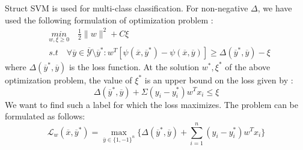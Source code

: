 \documentclass{article} %
\begin{document}
Struct SVM is used for multi-class classification. For non-negative $\Delta$, we have used the following formulation of optimization problem \cite{c1}:
\begin{equation*}
\begin{split}
& \underset{w,\xi \geq 0}{min} \quad \frac{1}{2}\|w\|^2+C\xi\\
& s.t \quad \forall\overline{y} \in \overline{\mathcal{Y}}\setminus\overline{y}^*:w^T[\psi(\overline{x},\overline{y}^*)- \psi(\overline{x},\overline{y})]\geq \Delta(\overline{y}^*,\overline{y})-\xi
\end{split}
\end{equation*}
where $\Delta(\overline{y}^*,\overline{y})$ is the loss function. At the solution $w^*, \xi^*$ of the above optimization problem, the value of $\xi^*$ is an upper bound on the loss given by \cite{c1}:
\begin{equation*}
	\Delta(\overline{y}^*,\overline{y}) + \Sigma (y_i - y_i^*)w^Tx_i \leq \xi
\end{equation*}
We want to find such a label for which the loss maximizes. The problem can be formulated as follows:
\begin{equation}
\label{eqn:1}
\mathcal L_w(\overline{x},\overline{y}^*)=\max_{\overline{y}\in\{1,-1\}^n}\{\Delta(\overline{y}^*,\overline{y}) + \sum_{i=1}^n (y_i - y_i^*)w^Tx_i\}
\end{equation}
\end{document}

